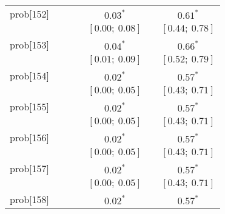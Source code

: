 \begin{table}
\begin{center}
\begin{tabular}{l c c c c c c }
prob[152] &                           &                           &                           & $0.03^{*}$              &                           & $0.61^{*}$            \\
          &                           &                           &                           & $[0.00;\ 0.08]$         &                           & $[0.44;\ 0.78]$       \\
prob[153] &                           &                           &                           & $0.04^{*}$              &                           & $0.66^{*}$            \\
          &                           &                           &                           & $[0.01;\ 0.09]$         &                           & $[0.52;\ 0.79]$       \\
prob[154] &                           &                           &                           & $0.02^{*}$              &                           & $0.57^{*}$            \\
          &                           &                           &                           & $[0.00;\ 0.05]$         &                           & $[0.43;\ 0.71]$       \\
prob[155] &                           &                           &                           & $0.02^{*}$              &                           & $0.57^{*}$            \\
          &                           &                           &                           & $[0.00;\ 0.05]$         &                           & $[0.43;\ 0.71]$       \\
prob[156] &                           &                           &                           & $0.02^{*}$              &                           & $0.57^{*}$            \\
          &                           &                           &                           & $[0.00;\ 0.05]$         &                           & $[0.43;\ 0.71]$       \\
prob[157] &                           &                           &                           & $0.02^{*}$              &                           & $0.57^{*}$            \\
          &                           &                           &                           & $[0.00;\ 0.05]$         &                           & $[0.43;\ 0.71]$       \\
prob[158] &                           &                           &                           & $0.02^{*}$              &                           & $0.57^{*}$            \\

\end{tabular}
\end{center}
\end{table}

